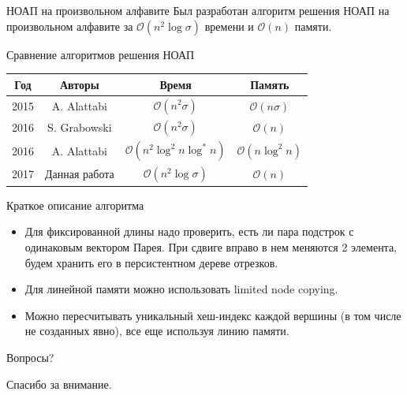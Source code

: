 \documentclass[hyperref=unicode,graphics=pdflatex,12pt]{beamer}
\begin{document}
\begin{frame}{НОАП на произвольном алфавите}
Был разработан алгоритм решения НОАП на произвольном алфавите
за $\mathcal{O}(n^2 \log \sigma)$ времени и $\mathcal{O}(n)$ памяти.

\vspace{0.5cm}

Сравнение алгоритмов решения НОАП

\begin{center}
\begin{tabular}{|c|c|c|c|}
\hline
Год & Авторы & Время & Память \\
\hline
2015 & A. Alattabi & $\mathcal{O}(n^2 \sigma)$ & $\mathcal{O}(n \sigma)$ \\
\hline
2016 & S. Grabowski & $\mathcal{O}(n^2 \sigma)$ & $\mathcal{O}(n)$ \\
\hline
2016 & A. Alattabi & $\mathcal{O}(n^2 \log^2 n \log^* n)$ & $\mathcal{O}(n \log^2 n)$ \\
\hline
2017 & Данная работа & $\mathcal{O}(n^2 \log \sigma)$ & $\mathcal{O}(n)$ \\
\hline
\end{tabular}
\end{center}
\end{frame}
      
\begin{frame}{Краткое описание алгоритма}
\vspace{0.5cm}
\hspace{0.5cm}
\begin{itemize}
\item Для фиксированной длины надо проверить, есть ли пара подстрок с одинаковым вектором Парея. При сдвиге вправо в нем меняются 2 элемента, будем хранить его в персистентном дереве отрезков.
\item<2-> Для линейной памяти можно использовать limited node copying.
\item<3-> Можно пересчитывать уникальный хеш-индекс каждой вершины (в том числе не созданных явно), все еще используя линию памяти.
\end{itemize}
\end{frame}


\begin{frame}{Вопросы?}
\begin{center}
Спасибо за внимание.
\end{center}
\end{frame}
\end{document}
